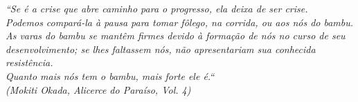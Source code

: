 \begin{epigrafe}
    \vspace*{\fill}
	\begin{flushright}
		\textit{``Se é a crise que abre caminho para o progresso, ela deixa de ser crise. \\
		Podemos compará-la à pausa para tomar fôlego, na corrida, ou aos nós do bambu. \\
		As varas do bambu se mantêm firmes devido à formação de nós no curso de seu desenvolvimento; se lhes faltassem nós, não apresentariam sua conhecida resistência. \\
		Quanto mais nós tem o bambu, mais forte ele é.`` \\
		(Mokiti Okada, Alicerce do Paraíso, Vol. 4)}
	\end{flushright}
\end{epigrafe}